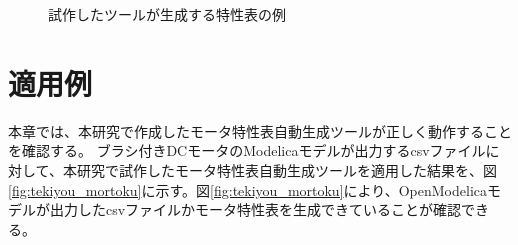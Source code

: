 \documentclass[uplatex, 10pt, a4p]{jsarticle}
\begin{document}
\begin{figure}[t]
	\centering
    \caption{試作したツールが生成する特性表の例}
	\label{fig:chtable}
\end{figure}

\section{適用例}\label{sec:Indication}
本章では、本研究で作成したモータ特性表自動生成ツールが正しく動作することを確認する。
ブラシ付きDCモータのModelicaモデルが出力するcsvファイルに対して、本研究で試作したモータ特性表自動生成ツールを適用した結果を、図\ref{fig:tekiyou_mortoku}に示す。図\ref{fig:tekiyou_mortoku}により、OpenModelicaモデルが出力したcsvファイルかモータ特性表を生成できていることが確認できる。
\end{document}
